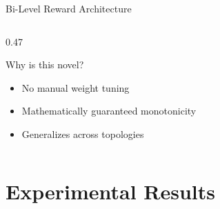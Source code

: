 \documentclass[aspectratio=169, 11pt]{beamer}
\begin{document}
\begin{frame}{Bi-Level Reward Architecture}
\begin{columns}[T]
\begin{column}{0.47\textwidth}
  \smallskip
  \begin{exampleblock}{Why is this novel?}
    \begin{itemize}\setlength{\itemsep}{0pt}
      \item No manual weight tuning
      \item Mathematically guaranteed monotonicity
      \item Generalizes across topologies
    \end{itemize}
  \end{exampleblock}

\end{column}
\end{columns}

\end{frame}


\section{Experimental Results}
\end{document}
